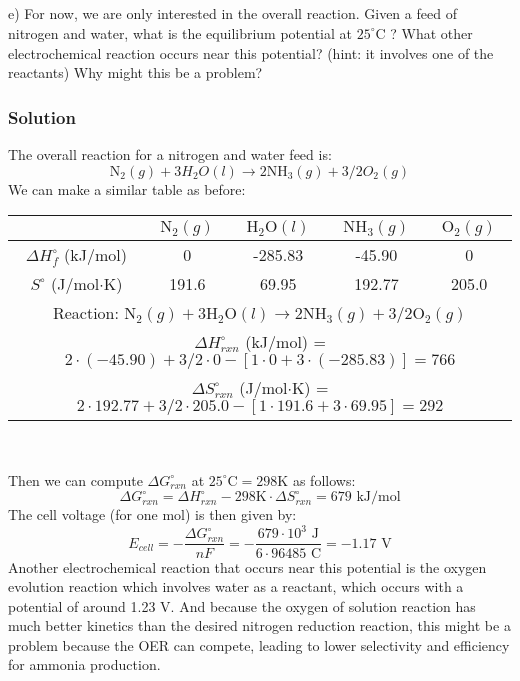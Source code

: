 \documentclass[12pt]{article}
\begin{document}
\subsection{}
e) For now, we are only interested in the overall reaction. Given a feed of nitrogen and water, what is the equilibrium potential at $25^{\circ} \mathrm{C}$ ? What other electrochemical reaction occurs near this potential? (hint: it involves one of the reactants) Why might this be a problem?\\
\subsubsection{Solution}
The overall reaction for a nitrogen and water feed is:
\begin{equation}
\mathrm{N}_{2}(g) + 3 H_{2}O(l) \rightarrow 2 \mathrm{NH}_{3}(g) + 3/2 O_{2}(g)
\end{equation}
We can make a similar table as before:
\begin{center}
\begin{tabular}{|c|c|c|c|c|}
\hline
    & $\mathrm{N_{2}}(g)$ & $\mathrm{H_{2}O}(l)$ & $\mathrm{NH_{3}}(g)$ & $\mathrm{O_{2}}(g)$ \\
\hline
$\Delta H_{f}^{\circ}$ (kJ/mol) & 0 & -285.83 & -45.90 & 0 \\
\hline
$S^{\circ}$ (J/mol$\cdot$K) & 191.6 & 69.95 & 192.77 & 205.0 \\
\hline
\multicolumn{5}{|c|}{Reaction: $\mathrm{N}_{2}(g) + 3 \mathrm{H_{2}O}(l) \rightarrow 2 \mathrm{NH}_{3}(g) + 3/2 \mathrm{O_{2}}(g)$} \\
\hline
\multicolumn{5}{|c|}{$\Delta H_{rxn}^{\circ}$ (kJ/mol) = $2 \cdot (-45.90) + 3/2 \cdot 0 - [1 \cdot 0 + 3 \cdot (-285.83)] = 766 $} \\
\hline
\multicolumn{5}{|c|}{$\Delta S_{rxn}^{\circ}$ (J/mol$\cdot$K) = $2 \cdot 192.77 + 3/2 \cdot 205.0 - [1 \cdot 191.6 + 3 \cdot 69.95] = 292$} \\
\hline
\end{tabular}\\
\end{center}
Then we can compute $\Delta G_{rxn}^{\circ}$ at $25^{\circ} \mathrm{C}=298 \mathrm{K}$ as follows:
\begin{equation}
\Delta G_{rxn}^{\circ} = \Delta H_{rxn}^{\circ} - 298 \mathrm{K} \cdot \Delta S_{rxn}^{\circ} = 679 \text{ kJ/mol}
\end{equation}
The cell voltage (for one mol) is then given by:
\begin{equation}E_{cell} = -\frac{\Delta G_{rxn}^{\circ}}{nF} = -\frac{679 \cdot 10^{3} \text{ J}}{6 \cdot 96485 \text{ C}} = -1.17 \text{ V}
\end{equation}
Another electrochemical reaction that occurs near this potential is the oxygen evolution reaction which involves water as a reactant, which occurs with a potential of around 1.23 V. And because the oxygen of solution reaction has much better kinetics than the desired nitrogen reduction reaction, this might be a problem because the OER can compete, leading to lower selectivity and efficiency for ammonia production.  
\end{document}
